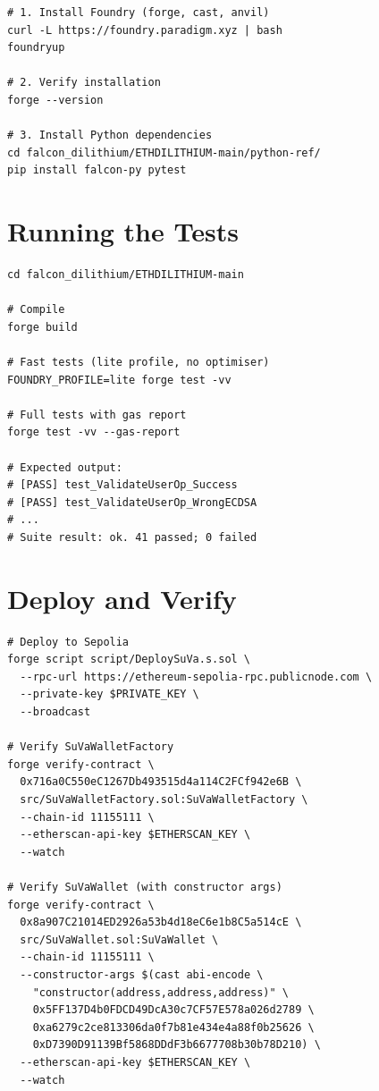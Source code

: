 \documentclass[11pt,a4paper]{article}
\begin{document}
\begin{lstlisting}[style=bash]
# 1. Install Foundry (forge, cast, anvil)
curl -L https://foundry.paradigm.xyz | bash
foundryup

# 2. Verify installation
forge --version

# 3. Install Python dependencies
cd falcon_dilithium/ETHDILITHIUM-main/python-ref/
pip install falcon-py pytest
\end{lstlisting}

\section{Running the Tests}

\begin{lstlisting}[style=bash]
cd falcon_dilithium/ETHDILITHIUM-main

# Compile
forge build

# Fast tests (lite profile, no optimiser)
FOUNDRY_PROFILE=lite forge test -vv

# Full tests with gas report
forge test -vv --gas-report

# Expected output:
# [PASS] test_ValidateUserOp_Success
# [PASS] test_ValidateUserOp_WrongECDSA
# ...
# Suite result: ok. 41 passed; 0 failed
\end{lstlisting}

\section{Deploy and Verify}

\begin{lstlisting}[style=bash]
# Deploy to Sepolia
forge script script/DeploySuVa.s.sol \
  --rpc-url https://ethereum-sepolia-rpc.publicnode.com \
  --private-key $PRIVATE_KEY \
  --broadcast

# Verify SuVaWalletFactory
forge verify-contract \
  0x716a0C550eC1267Db493515d4a114C2FCf942e6B \
  src/SuVaWalletFactory.sol:SuVaWalletFactory \
  --chain-id 11155111 \
  --etherscan-api-key $ETHERSCAN_KEY \
  --watch

# Verify SuVaWallet (with constructor args)
forge verify-contract \
  0x8a907C21014ED2926a53b4d18eC6e1b8C5a514cE \
  src/SuVaWallet.sol:SuVaWallet \
  --chain-id 11155111 \
  --constructor-args $(cast abi-encode \
    "constructor(address,address,address)" \
    0x5FF137D4b0FDCD49DcA30c7CF57E578a026d2789 \
    0xa6279c2ce813306da0f7b81e434e4a88f0b25626 \
    0xD7390D91139Bf5868DDdF3b6677708b30b78D210) \
  --etherscan-api-key $ETHERSCAN_KEY \
  --watch
\end{lstlisting}
\end{document}
